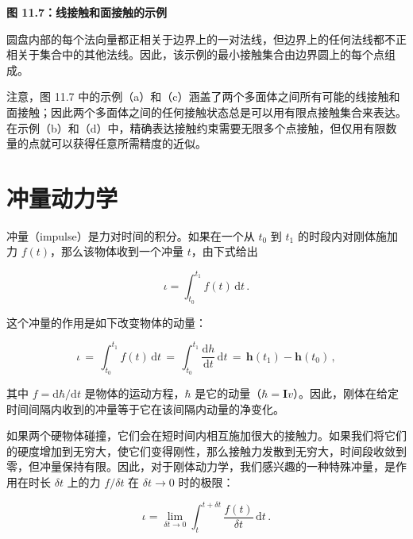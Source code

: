 \documentclass[10pt,a4paper]{book}
\theoremstyle{thmstyle} %
\theoremstyle{defstyle} %
\theoremstyle{prostyle} %
\begin{document}
\noindent\textbf{图 11.7：线接触和面接触的示例}





圆盘内部的每个法向量都正相关于边界上的一对法线，但边界上的任何法线都不正相关于集合中的其他法线。因此，该示例的最小接触集合由边界圆上的每个点组成。



注意，图 11.7 中的示例（a）和（c）涵盖了两个多面体之间所有可能的线接触和面接触；因此两个多面体之间的任何接触状态总是可以用有限点接触集合来表达。在示例（b）和（d）中，精确表达接触约束需要无限多个点接触，但仅用有限数量的点就可以获得任意所需精度的近似。



\section{冲量动力学}





冲量（impulse）是力对时间的积分。如果在一个从 $t_0$ 到 $t_1$ 的时段内对刚体施加力 $f(t)$，那么该物体收到一个冲量 $t$，由下式给出



$$
\iota = \int _ { t _ { 0 } } ^{t _ { 1} } f ( t ) \, \mathrm { d } t \, .
$$



这个冲量的作用是如下改变物体的动量：



$$
\iota \, = \, \int _ { t _ { 0 } } ^{t _ { 1} } f ( t ) \, \mathrm { d } t \, = \, \int _ { t _ { 0 } } ^{t _ { 1} } \frac { \mathrm { d } h } { \mathrm { d } t } \, \mathrm { d } t \, = \, \boldsymbol{ h } ( t _ { 1 } ) - \boldsymbol{ h } ( t _ { 0 } ) \, ,
$$



其中 $f = \mathrm{d}\hbar/\mathrm{d}t$ 是物体的运动方程，$\hbar$ 是它的动量（$\hbar = \mathbf{I}v$）。因此，刚体在给定时间间隔内收到的冲量等于它在该间隔内动量的净变化。



如果两个硬物体碰撞，它们会在短时间内相互施加很大的接触力。如果我们将它们的硬度增加到无穷大，使它们变得刚性，那么接触力发散到无穷大，时间段收敛到零，但冲量保持有限。因此，对于刚体动力学，我们感兴趣的一种特殊冲量，是作用在时长 $\delta t$ 上的力 $f/\delta t$ 在 $\delta t \to 0$ 时的极限：



$$
\iota = \operatorname* { l i m } _ { \delta t \rightarrow 0 } \int _ { t } ^{t + \delta t} { \frac { f ( t ) } { \delta t } } \, \mathrm { d } t \, .
$$
\end{document}
